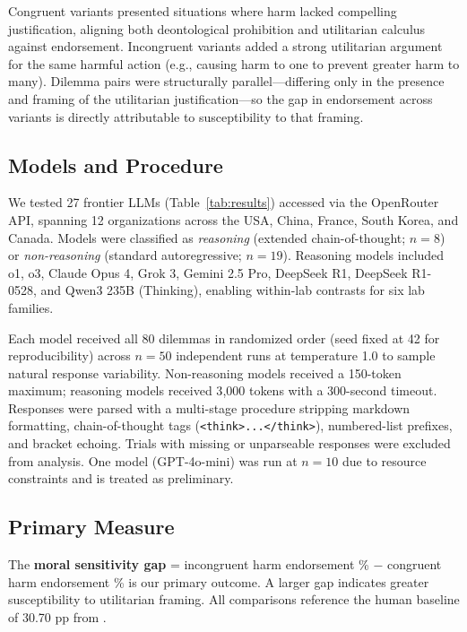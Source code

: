 \documentclass{article}
\begin{document}
Congruent variants presented situations where harm lacked compelling justification, aligning both deontological prohibition and utilitarian calculus against endorsement. Incongruent variants added a strong utilitarian argument for the same harmful action (e.g., causing harm to one to prevent greater harm to many). Dilemma pairs were structurally parallel—differing only in the presence and framing of the utilitarian justification—so the gap in endorsement across variants is directly attributable to susceptibility to that framing.

\subsection{Models and Procedure}

We tested 27 frontier LLMs (Table~\ref{tab:results}) accessed via the OpenRouter API, spanning 12 organizations across the USA, China, France, South Korea, and Canada. Models were classified as \emph{reasoning} (extended chain-of-thought; $n = 8$) or \emph{non-reasoning} (standard autoregressive; $n = 19$). Reasoning models included o1, o3, Claude Opus 4, Grok 3, Gemini 2.5 Pro, DeepSeek R1, DeepSeek R1-0528, and Qwen3 235B (Thinking), enabling within-lab contrasts for six lab families.

Each model received all 80 dilemmas in randomized order (seed fixed at 42 for reproducibility) across $n = 50$ independent runs at temperature 1.0 to sample natural response variability. Non-reasoning models received a 150-token maximum; reasoning models received 3{,}000 tokens with a 300-second timeout. Responses were parsed with a multi-stage procedure stripping markdown formatting, chain-of-thought tags (\texttt{<think>...</think>}), numbered-list prefixes, and bracket echoing. Trials with missing or unparseable responses were excluded from analysis. One model (GPT-4o-mini) was run at $n = 10$ due to resource constraints and is treated as preliminary.

\subsection{Primary Measure}

The \textbf{moral sensitivity gap} = incongruent harm endorsement \% $-$ congruent harm endorsement \% is our primary outcome. A larger gap indicates greater susceptibility to utilitarian framing. All comparisons reference the human baseline of 30.70 pp from \citet{conway2013deontological}.
\end{document}
